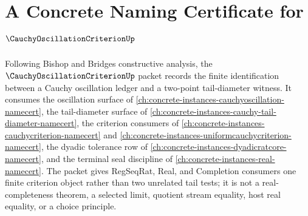 \chapter{A Concrete Naming Certificate for $\CauchyOscillationCriterionUp$}
\label{ch:concrete-instances-cauchy-oscillation-criterion-namecert}

Following Bishop and Bridges constructive analysis, the $\CauchyOscillationCriterionUp$ packet records the finite identification between a Cauchy oscillation ledger and a two-point tail-diameter witness. It consumes the oscillation surface of \autoref{ch:concrete-instances-cauchyoscillation-namecert}, the tail-diameter surface of \autoref{ch:concrete-instances-cauchy-tail-diameter-namecert}, the criterion consumers of \autoref{ch:concrete-instances-cauchycriterion-namecert} and \autoref{ch:concrete-instances-uniformcauchycriterion-namecert}, the dyadic tolerance row of \autoref{ch:concrete-instances-dyadicratcore-namecert}, and the terminal seal discipline of \autoref{ch:concrete-instances-real-namecert}. The packet gives RegSeqRat, Real, and Completion consumers one finite criterion object rather than two unrelated tail tests; it is not a real-completeness theorem, a selected limit, quotient stream equality, host real equality, or a choice principle.

